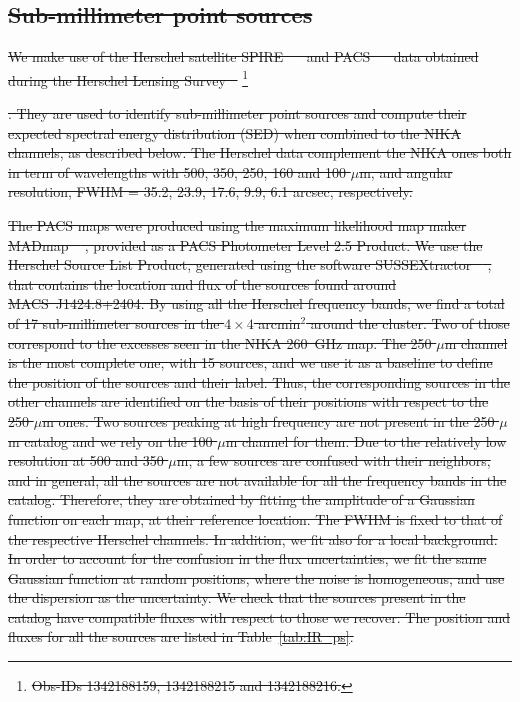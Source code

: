 \documentclass[twocolumn,traditabstract]{aa}
\providecommand{\DIFdeltex}[1]{{\protect\color{red}\sout{#1}}}                      %
\providecommand{\DIFdelbegin}{} %
\providecommand{\DIFdel}[1]{\texorpdfstring{\DIFdeltex{#1}}{}} %
\begin{document}
\DIFdelbegin \subsection{\DIFdel{Sub-millimeter point sources}}
\addtocounter{subsection}{-1}%
\DIFdel{We make use of the Herschel satellite SPIRE \mbox{%
\citep{griffin2010} }%
and PACS \mbox{%
\citep{poglitsch2010} }%
data obtained during the Herschel Lensing Survey \mbox{%
\citep[HLS,][]{egami2010,rawle2012}}%
}\footnote{\DIFdel{Obs-IDs 1342188159, 1342188215 and 1342188216.}}%
\addtocounter{footnote}{-1}%
\DIFdel{. They are used to identify sub-millimeter point sources and compute their expected spectral energy distribution (SED) when combined to the NIKA channels, as described below. The Herschel data complement the NIKA ones both in term of wavelengths with 500, 350, 250, 160 and 100 $\mu$m, and angular resolution, FWHM = 35.2, 23.9, 17.6, 9.9, 6.1 arcsec, respectively.
}%

\DIFdel{The PACS maps were produced using the maximum likelihood map maker MADmap \mbox{%
\citep{cantalupo2010}}%
, provided as a PACS Photometer Level 2.5 Product. We use the Herschel Source List Product, generated using the software SUSSEXtractor \mbox{%
\citep{savage2007}}%
, that contains the location and flux of the sources found around \mbox{MACS~J1424.8+2404}. By using all the Herschel frequency bands, we find a total of 17 sub-millimeter sources in the $4 \times 4$ arcmin$^2$ around the cluster. Two of those correspond to the excesses seen in the NIKA 260~GHz map. The 250 $\mu$m channel is the most complete one, with 15 sources, and we use it as a baseline to define the position of the sources and their label. Thus, the corresponding sources in the other channels are identified on the basis of their positions with respect to the 250 $\mu$m ones. Two sources peaking at high frequency are not present in the 250 $\mu$m catalog and we rely on the 100 $\mu$m channel for them. Due to the relatively low resolution at 500 and 350 $\mu$m, a few sources are confused with their neighbors, and in general, all the sources are not available for all the frequency bands in the catalog. Therefore, they are obtained by fitting the amplitude of a Gaussian function on each map, at their reference location. The FWHM is fixed to that of the respective Herschel channels. In addition, we fit also for a local background. In order to account for the confusion in the flux uncertainties, we fit the same Gaussian function at random positions, where the noise is homogeneous, and use the dispersion as the uncertainty. We check that the sources present in the catalog have compatible fluxes with respect to those we recover. The position and fluxes for all the sources are listed in Table~\ref{tab:IR_ps}.
}%
\end{document}
